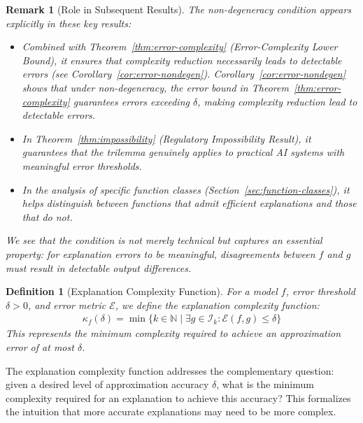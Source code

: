 \documentclass[11pt,letter,leqno]{article}
\newtheorem{definition}[theorem]{Definition}
\newtheorem{remark}[theorem]{Remark}
\begin{document}
\begin{remark}[Role in Subsequent Results]
\label{rem:role-in-results}
The non-degeneracy condition appears explicitly in these key results:

\begin{itemize}
\item Combined with Theorem~\ref{thm:error-complexity} 
(Error-Complexity Lower Bound), it ensures that complexity reduction necessarily 
leads to detectable errors (see Corollary~\ref{cor:error-nondegen}).  Corollary~\ref{cor:error-nondegen} shows that under non-degeneracy, the 
error bound in Theorem~\ref{thm:error-complexity} guarantees errors exceeding 
$\delta$, making complexity reduction lead to \emph{detectable} errors.

\item In Theorem~\ref{thm:impossibility} (Regulatory Impossibility Result), it 
guarantees that the trilemma genuinely applies to practical AI systems with 
meaningful error thresholds.

\item In the analysis of specific function classes (Section~\ref{sec:function-classes}), 
it helps distinguish between functions that admit efficient explanations and 
those that do not.
\end{itemize}

We see that the condition is not merely technical but captures an essential 
property: for explanation errors to be meaningful, disagreements between $f$ and 
$g$ must result in detectable output differences.
\end{remark}


\begin{definition}[Explanation Complexity Function]
\label{def:complexity-function}
For a model $f$, error threshold $\delta > 0$, and error metric $\mathcal{E}$, we define the explanation complexity function:
\begin{align}
\kappa_f(\delta) = \min\{k \in \mathbb{N} \mid \exists g \in \mathcal{I}_k : \mathcal{E}(f, g) \leq \delta\}
\end{align}
This represents the minimum complexity required to achieve an approximation error of at most $\delta$.
\end{definition}

The explanation complexity function addresses the complementary question: given a desired level of approximation accuracy $\delta$, what is the minimum complexity required for an explanation to achieve this accuracy?  This formalizes the intuition that more accurate explanations may need to be more complex.
\end{document}
